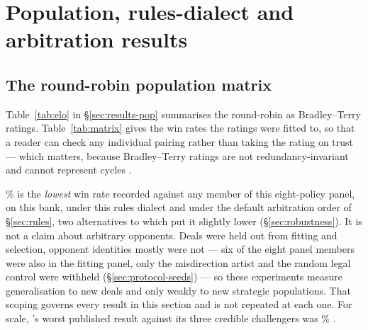 \section{Population, rules-dialect and arbitration results}
\label{app:dialects}


\subsection{The round-robin population matrix}
\label{app:pop-matrix}

Table~\ref{tab:elo} in \S\ref{sec:results-pop} summarises the round-robin as
Bradley--Terry ratings. Table~\ref{tab:matrix} gives the win rates the ratings
were fitted to, so that a reader can check any individual pairing rather than
taking the rating on trust --- which matters, because Bradley--Terry ratings are
not redundancy-invariant and cannot represent cycles \cite{balduzzi-reeval}.

\begin{table}[!htbp]
\centering
\caption{Primary head-to-head (E3). Population: \numHtHDeals{} held-out deals in
all six seat rotations, \numHtHGames{} games per row, seed $90210$, full rules
dialect, \vfast{} frozen at the shipping configuration before the bank was run,
against the eight-policy panel. Intervals: deal-clustered percentile bootstrap on
the per-deal win count, \numBootstrapDraws{} resamples. ``Mean half-suits'' is
half-suits won of nine; the two declaration columns count \emph{voluntary}
declarations only, forced endgame declarations being tallied separately in the
run artifact and not shown here (\S\ref{sec:protocol-metrics}). Action-limit rate
\numLimitRate{} on every row.}
\label{tab:h2h}
\small

\end{table}

\numWorstCase\% is the \emph{lowest} win rate \vfast{} recorded against any
member of this eight-policy panel, on this bank, under this rules dialect and
under the default arbitration order of \S\ref{sec:rules}, two alternatives to
which put it slightly lower (\S\ref{sec:robustness}). It is not a claim about
arbitrary opponents. Deals were held out from fitting and selection, opponent
identities mostly were not --- six of the eight panel members were also in the
fitting panel, only the misdirection artist and the random legal control were
withheld (\S\ref{sec:protocol-seeds}) --- so these experiments measure
generalisation to new deals and only weakly to new strategic populations. That
scoping governs every result in this section and is not repeated at each one. For
scale, \vthree{}'s worst published result against its three credible challengers
was \numVthreeWorstPublished\% \cite{fishbot03}.

